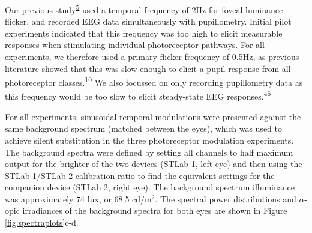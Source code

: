 \documentclass[
]{article}
\begin{document}
Our previous study\textsuperscript{\protect\hyperlink{ref-Segala2023}{5}} used a temporal frequency of 2Hz for foveal luminance flicker, and recorded EEG data simultaneously with pupillometry. Initial pilot experiments indicated that this frequency was too high to elicit measurable responses when stimulating individual photoreceptor pathways. For all experiments, we therefore used a primary flicker frequency of 0.5Hz, as previous literature showed that this was slow enough to elicit a pupil response from all photoreceptor classes.\textsuperscript{\protect\hyperlink{ref-Spitschan2014}{10}} We also focussed on only recording pupillometry data as this frequency would be too slow to elicit steady-state EEG responses.\textsuperscript{\protect\hyperlink{ref-Norcia2015}{46}}

For all experiments, sinusoidal temporal modulations were presented against the same background spectrum (matched between the eyes), which was used to achieve silent substitution in the three photoreceptor modulation experiments. The background spectra were defined by setting all channels to half maximum output for the brighter of the two devices (STLab 1, left eye) and then using the STLab 1/STLab 2 calibration ratio to find the equivalent settings for the companion device (STLab 2, right eye). The background spectrum illuminance was approximately 74 lux, or 68.5 cd/m\(^2\). The spectral power distributions and \(\alpha\)-opic irradiances of the background spectra for both eyes are shown in Figure \ref{fig:spectraplots}c-d.
\end{document}

